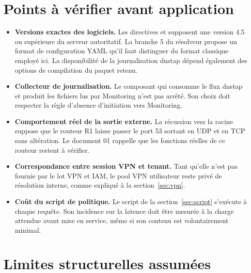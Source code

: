 \section{Points à vérifier avant application}

\begin{itemize}
  \item \textbf{Versions exactes des logiciels.} Les directives  et
     supposent une version 4.5 ou supérieure du serveur
    autoritatif. La branche 5 du résolveur propose un format de configuration
    YAML qu'il faut distinguer du format classique employé ici. La disponibilité
    de la journalisation dnstap dépend également des options de compilation du
    paquet retenu.
  \item \textbf{Collecteur de journalisation.} Le composant qui consomme le flux
    dnstap et produit les fichiers lus par Monitoring n'est pas arrêté. Son
    choix doit respecter la règle d'absence d'initiation vers Monitoring.
  \item \textbf{Comportement réel de la sortie externe.} La récursion vers la
    racine suppose que le routeur R1 laisse passer le port 53 sortant en UDP et
    en TCP sans altération. Le document 01 rappelle que les fonctions réelles de
    ce routeur restent à vérifier.
  \item \textbf{Correspondance entre session VPN et tenant.} Tant qu'elle n'est
    pas fournie par le lot VPN et IAM, le pool VPN utilisateur reste privé de
    résolution interne, comme expliqué à la section~\ref{sec:vpn}.
  \item \textbf{Coût du script de politique.} Le script de la
    section~\ref{sec:script} s'exécute à chaque requête. Son incidence sur la
    latence doit être mesurée à la charge attendue avant mise en service, même
    si son contenu est volontairement minimal.
\end{itemize}

\section{Limites structurelles assumées}

